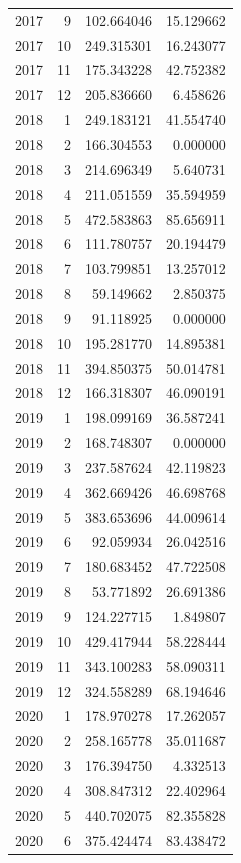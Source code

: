 \begin{tabular}{rrrr}
2017 & 9 & 102.664046 & 15.129662 \\
2017 & 10 & 249.315301 & 16.243077 \\
2017 & 11 & 175.343228 & 42.752382 \\
2017 & 12 & 205.836660 & 6.458626 \\
2018 & 1 & 249.183121 & 41.554740 \\
2018 & 2 & 166.304553 & 0.000000 \\
2018 & 3 & 214.696349 & 5.640731 \\
2018 & 4 & 211.051559 & 35.594959 \\
2018 & 5 & 472.583863 & 85.656911 \\
2018 & 6 & 111.780757 & 20.194479 \\
2018 & 7 & 103.799851 & 13.257012 \\
2018 & 8 & 59.149662 & 2.850375 \\
2018 & 9 & 91.118925 & 0.000000 \\
2018 & 10 & 195.281770 & 14.895381 \\
2018 & 11 & 394.850375 & 50.014781 \\
2018 & 12 & 166.318307 & 46.090191 \\
2019 & 1 & 198.099169 & 36.587241 \\
2019 & 2 & 168.748307 & 0.000000 \\
2019 & 3 & 237.587624 & 42.119823 \\
2019 & 4 & 362.669426 & 46.698768 \\
2019 & 5 & 383.653696 & 44.009614 \\
2019 & 6 & 92.059934 & 26.042516 \\
2019 & 7 & 180.683452 & 47.722508 \\
2019 & 8 & 53.771892 & 26.691386 \\
2019 & 9 & 124.227715 & 1.849807 \\
2019 & 10 & 429.417944 & 58.228444 \\
2019 & 11 & 343.100283 & 58.090311 \\
2019 & 12 & 324.558289 & 68.194646 \\
2020 & 1 & 178.970278 & 17.262057 \\
2020 & 2 & 258.165778 & 35.011687 \\
2020 & 3 & 176.394750 & 4.332513 \\
2020 & 4 & 308.847312 & 22.402964 \\
2020 & 5 & 440.702075 & 82.355828 \\
2020 & 6 & 375.424474 & 83.438472 \\

\end{tabular}
